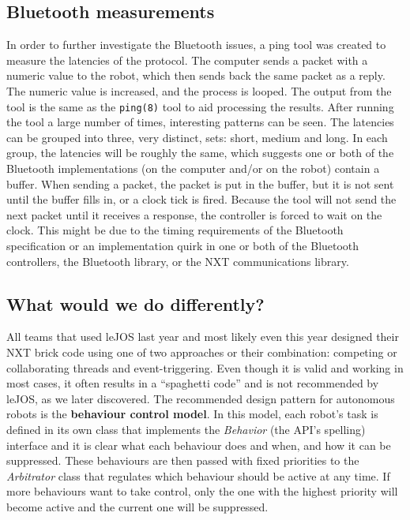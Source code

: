 \subsection{Bluetooth measurements}
In order to further investigate the Bluetooth issues, a ping tool was created to measure the latencies of the protocol. The computer sends a packet with a numeric value to the robot, which then sends back the same packet as a reply. The numeric value is increased, and the process is looped. The output from the tool is the same as the \texttt{ping(8)} tool to aid processing the results. After running the tool a large number of times, interesting patterns can be seen. The latencies can be grouped into three, very distinct, sets: short, medium and long. In each group, the latencies will be roughly the same, which suggests one or both of the Bluetooth implementations (on the computer and/or on the robot) contain a buffer. When sending a packet, the packet is put in the buffer, but it is not sent until the buffer fills in, or a clock tick is fired. Because the tool will not send the next packet until it receives a response, the controller is forced to wait on the clock. This might be due to the timing requirements of the Bluetooth specification or an implementation quirk in one or both of the Bluetooth controllers, the Bluetooth library, or the NXT communications library.

\subsection{What would we do differently?}
All teams that used leJOS last year and most likely even this year designed their NXT brick code using one of two approaches or their combination: competing or collaborating threads and event-triggering. Even though it is valid and working in most cases, it often results in a ``spaghetti code'' and is not recommended by leJOS, as we later discovered. The recommended design pattern for autonomous robots is the \textbf{behaviour control model}\cite{behaviour}. In this model, each robot's task is defined in its own class that implements the \textsl{Behavior} (the API's spelling) interface and it is clear what each behaviour does and when, and how it can be suppressed. These behaviours are then passed with fixed priorities to the \textsl{Arbitrator} class that regulates which behaviour should be active at any time. If more behaviours want to take control, only the one with the highest priority will become active and the current one will be suppressed.

